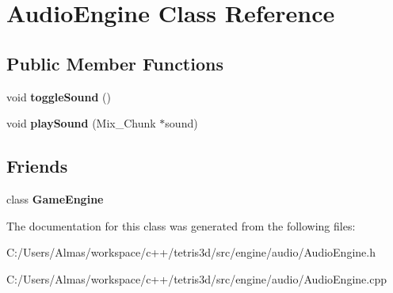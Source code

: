 \hypertarget{class_audio_engine}{\section{Audio\-Engine Class Reference}
\label{class_audio_engine}
}
\subsection*{Public Member Functions}
\begin{DoxyCompactItemize}
\item 
\hypertarget{class_audio_engine_a51120931335e12ecab757994e49e17d5}{void {\bfseries toggle\-Sound} ()}\label{class_audio_engine_a51120931335e12ecab757994e49e17d5}

\item 
\hypertarget{class_audio_engine_ace104d9cfee63155f92ddc50567041cd}{void {\bfseries play\-Sound} (Mix\-\_\-\-Chunk $\ast$sound)}\label{class_audio_engine_ace104d9cfee63155f92ddc50567041cd}

\end{DoxyCompactItemize}
\subsection*{Friends}
\begin{DoxyCompactItemize}
\item 
\hypertarget{class_audio_engine_a9ca20b077852bfc7b050d3a6a32d1a40}{class {\bfseries Game\-Engine}}\label{class_audio_engine_a9ca20b077852bfc7b050d3a6a32d1a40}

\end{DoxyCompactItemize}


The documentation for this class was generated from the following files\-:\begin{DoxyCompactItemize}
\item 
C\-:/\-Users/\-Almas/workspace/c++/tetris3d/src/engine/audio/Audio\-Engine.\-h\item 
C\-:/\-Users/\-Almas/workspace/c++/tetris3d/src/engine/audio/Audio\-Engine.\-cpp\end{DoxyCompactItemize}
